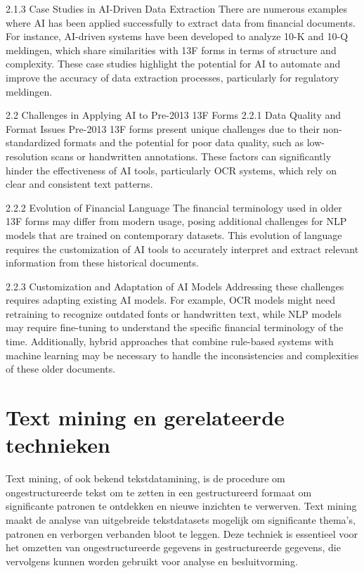 2.1.3 Case Studies in AI-Driven Data Extraction
There are numerous examples where AI has been applied successfully to extract data from financial documents. For instance, AI-driven systems have been developed to analyze 10-K and 10-Q meldingen, which share similarities with 13F forms in terms of structure and complexity. These case studies highlight the potential for AI to automate and improve the accuracy of data extraction processes, particularly for regulatory meldingen.

2.2 Challenges in Applying AI to Pre-2013 13F Forms
2.2.1 Data Quality and Format Issues
Pre-2013 13F forms present unique challenges due to their non-standardized formats and the potential for poor data quality, such as low-resolution scans or handwritten annotations. These factors can significantly hinder the effectiveness of AI tools, particularly OCR systems, which rely on clear and consistent text patterns.

2.2.2 Evolution of Financial Language
The financial terminology used in older 13F forms may differ from modern usage, posing additional challenges for NLP models that are trained on contemporary datasets. This evolution of language requires the customization of AI tools to accurately interpret and extract relevant information from these historical documents.

2.2.3 Customization and Adaptation of AI Models
Addressing these challenges requires adapting existing AI models. For example, OCR models might need retraining to recognize outdated fonts or handwritten text, while NLP models may require fine-tuning to understand the specific financial terminology of the time. Additionally, hybrid approaches that combine rule-based systems with machine learning may be necessary to handle the inconsistencies and complexities of these older documents.
\\
\section{Text mining en gerelateerde technieken}
Text mining, of ook bekend tekstdatamining, is de procedure om ongestructureerde tekst om te zetten in een gestructureerd formaat om significante patronen te ontdekken en nieuwe inzichten te verwerven. Text mining maakt de analyse van uitgebreide tekstdatasets mogelijk om significante thema's, patronen en verborgen verbanden bloot te leggen. Deze techniek is essentieel voor het omzetten van ongestructureerde gegevens in gestructureerde gegevens, die vervolgens kunnen worden gebruikt voor analyse en besluitvorming\autocite{IBM2024}.

